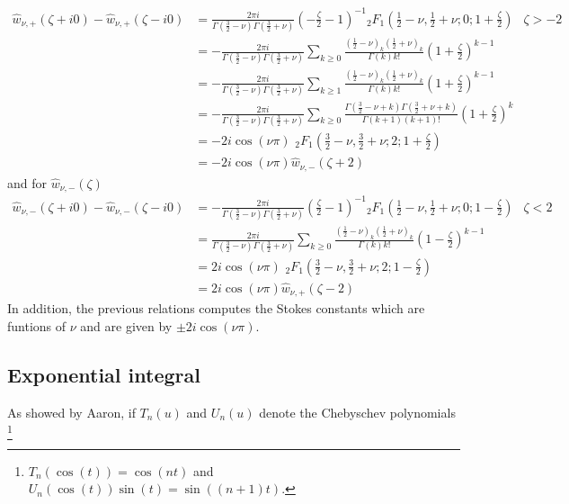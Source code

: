 \documentclass{article}
\begin{document}
\begin{align*}
\hat{w}_{\nu,+}(\zeta+i0)-\hat{w}_{\nu,+}(\zeta-i0)&=\frac{2\pi i}{\Gamma(\tfrac{3}{2}-\nu)\Gamma(\tfrac{3}{2}+\nu)}\left(-\frac{\zeta}{2}-1\right)^{-1}{}_2F_1\left(\frac{1}{2}-\nu,\frac{1}{2}+\nu;0;1+\frac{\zeta}{2}\right) & \zeta>-2 \\
&=-\frac{2\pi i}{\Gamma(\tfrac{3}{2}-\nu)\Gamma(\tfrac{3}{2}+\nu)}\sum_{k\geq 0}\frac{\left(\tfrac{1}{2}-\nu\right)_k\left(\tfrac{1}{2}+\nu\right)_k}{\Gamma(k)k!}\left(1+\frac{\zeta}{2}\right)^{k-1} & \\
&=-\frac{2\pi i}{\Gamma(\tfrac{3}{2}-\nu)\Gamma(\tfrac{3}{2}+\nu)}\sum_{k\geq 1}\frac{\left(\tfrac{1}{2}-\nu\right)_k\left(\tfrac{1}{2}+\nu\right)_k}{\Gamma(k)k!}\left(1+\frac{\zeta}{2}\right)^{k-1} & \\
&=-\frac{2\pi i}{\Gamma(\tfrac{3}{2}-\nu)\Gamma(\tfrac{3}{2}+\nu)}\sum_{k\geq 0}\frac{\Gamma\left(\tfrac{3}{2}-\nu+k\right)\Gamma\left(\tfrac{3}{2}+\nu+k\right)}{\Gamma(k+1)(k+1)!}\left(1+\frac{\zeta}{2}\right)^{k} & \\
&=-2i\cos(\nu \pi)\,\, {}_2F_1\left(\frac{3}{2}-\nu,\frac{3}{2}+\nu;2;1+\frac{\zeta}{2}\right) & \\
&=-2i\cos(\nu \pi)\hat{w}_{\nu,-}(\zeta+2)
\end{align*} 
and for $\hat{w}_{\nu,-}(\zeta)$
\begin{align*}
\hat{w}_{\nu,-}(\zeta+i0)-\hat{w}_{\nu,-}(\zeta-i0)&=-\frac{2\pi i}{\Gamma(\tfrac{3}{2}-\nu)\Gamma(\tfrac{3}{2}+\nu)}\left(\frac{\zeta}{2}-1\right)^{-1}{}_2F_1\left(\frac{1}{2}-\nu,\frac{1}{2}+\nu;0;1-\frac{\zeta}{2}\right) & \zeta<2 \\
&=\frac{2\pi i}{\Gamma(\tfrac{3}{2}-\nu)\Gamma(\tfrac{3}{2}+\nu)}\sum_{k\geq 0}\frac{\left(\tfrac{1}{2}-\nu\right)_k\left(\tfrac{1}{2}+\nu\right)_k}{\Gamma(k)k!}\left(1-\frac{\zeta}{2}\right)^{k-1} & \\
&=2i\cos(\nu \pi)\,\, {}_2F_1\left(\frac{3}{2}-\nu,\frac{3}{2}+\nu;2;1-\frac{\zeta}{2}\right) & \\
&=2i\cos(\nu \pi)\hat{w}_{\nu,+}(\zeta-2)
\end{align*}
In addition, the previous relations computes the Stokes constants which are funtions of $\nu$ and are given by $\pm 2i\cos(\nu\pi)$.


\subsection{Exponential integral}
As showed by Aaron, if $T_n(u)$ and $U_n(u)$ denote the Chebyschev polynomials \footnote{$T_n(\cos(t))=\cos(nt)$ and $U_n(\cos(t))\sin(t)=\sin((n+1)t)$.} 
\end{document}
